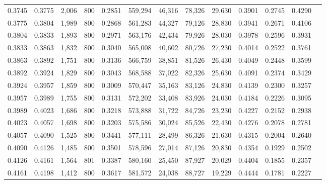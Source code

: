 \begin{tabular}{rrrrrrrrrrrrr}
0.3745 & 0.3775 &  2,006 &   800 &                                     0.2851 & 559,294 &  46,316 &  78,326 &  29,630 & 0.3901 & 0.2745 & 0.4290 \\
0.3775 & 0.3804 &  1,989 &   800 &                                     0.2868 & 561,283 &  44,327 &  79,126 &  28,830 & 0.3941 & 0.2671 & 0.4106 \\
0.3804 & 0.3833 &  1,893 &   800 &                                     0.2971 & 563,176 &  42,434 &  79,926 &  28,030 & 0.3978 & 0.2596 & 0.3931 \\
0.3833 & 0.3863 &  1,832 &   800 &                                     0.3040 & 565,008 &  40,602 &  80,726 &  27,230 & 0.4014 & 0.2522 & 0.3761 \\
0.3863 & 0.3892 &  1,751 &   800 &                                     0.3136 & 566,759 &  38,851 &  81,526 &  26,430 & 0.4049 & 0.2448 & 0.3599 \\
0.3892 & 0.3924 &  1,829 &   800 &                                     0.3043 & 568,588 &  37,022 &  82,326 &  25,630 & 0.4091 & 0.2374 & 0.3429 \\
0.3924 & 0.3957 &  1,859 &   800 &                                     0.3009 & 570,447 &  35,163 &  83,126 &  24,830 & 0.4139 & 0.2300 & 0.3257 \\
0.3957 & 0.3989 &  1,755 &   800 &                                     0.3131 & 572,202 &  33,408 &  83,926 &  24,030 & 0.4184 & 0.2226 & 0.3095 \\
0.3989 & 0.4023 &  1,686 &   800 &                                     0.3218 & 573,888 &  31,722 &  84,726 &  23,230 & 0.4227 & 0.2152 & 0.2938 \\
0.4023 & 0.4057 &  1,698 &   800 &                                     0.3203 & 575,586 &  30,024 &  85,526 &  22,430 & 0.4276 & 0.2078 & 0.2781 \\
0.4057 & 0.4090 &  1,525 &   800 &                                     0.3441 & 577,111 &  28,499 &  86,326 &  21,630 & 0.4315 & 0.2004 & 0.2640 \\
0.4090 & 0.4126 &  1,485 &   800 &                                     0.3501 & 578,596 &  27,014 &  87,126 &  20,830 & 0.4354 & 0.1929 & 0.2502 \\
0.4126 & 0.4161 &  1,564 &   801 &                                     0.3387 & 580,160 &  25,450 &  87,927 &  20,029 & 0.4404 & 0.1855 & 0.2357 \\
0.4161 & 0.4198 &  1,412 &   800 &                                     0.3617 & 581,572 &  24,038 &  88,727 &  19,229 & 0.4444 & 0.1781 & 0.2227 \\

\end{tabular}
